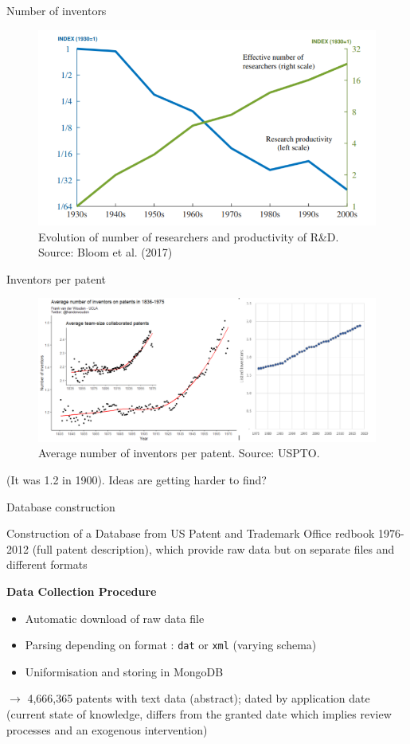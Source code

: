 \documentclass{beamer}
\begin{document}
\begin{frame}{Number of inventors}
    \begin{figure}
        \centering
        \includegraphics[width=0.8\linewidth]{figures/inventors.png}
        \caption{Evolution of number of researchers and productivity of R\&D. Source: Bloom et al. (2017)}
    \end{figure}
\end{frame}
\begin{frame}{Inventors per patent}
    \begin{figure}
        \centering
        \includegraphics[width=0.8\linewidth]{figures/inv_per_patent.png}
        \caption{Average number of inventors per patent. Source: USPTO.}
    \end{figure}
    
    (It was 1.2 in 1900). Ideas are getting harder to find?
\end{frame}
    
\begin{frame}{Database construction}
    
Construction of a Database from US Patent and Trademark Office redbook 1976-2012 (full patent description), which provide raw data but on separate files and different formats

\bigskip

\textbf{Data Collection Procedure}

\begin{itemize}
\item Automatic download of raw data file
\item Parsing depending on format : \texttt{dat} or \texttt{xml} (varying schema)
\item Uniformisation and storing in MongoDB
\end{itemize}

\bigskip

$\rightarrow$ 4,666,365 patents with text data (abstract); dated by application date (current state of knowledge, differs from the granted date which implies review processes and an exogenous intervention)

\end{frame}
\end{document}
